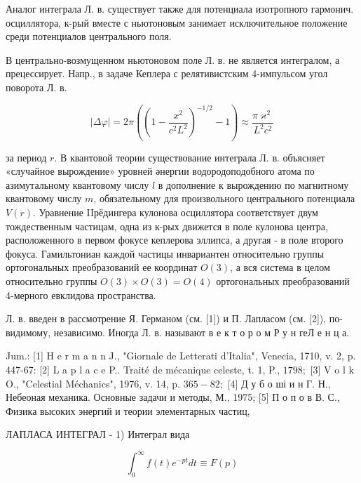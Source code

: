 \documentclass[10pt]{article}
\begin{document}
Аналог интеграла Л. в. существует также для потенциала изотропного гармонич. осциллятора, к-рый вместе с ньютоновым занимает исключительное положение среди потенциалов центрального поля.



В центрально-возмущенном ньютоновом поле Л. в. не является интегралом, а прецессирует. Напр., в задаче Кеплера с релятивистским 4-импульсом угол поворота Л. в.



\[

|\Delta \varphi|=2 \pi\left(\left(1-\frac{x^{2}}{c^{2} L^{2}}\right)^{-1 / 2}-1\right) \approx \frac{\pi \varkappa^{2}}{L^{2} c^{2}}

\]



за период $r$. В квантовой теории существование интеграла Л. в. объясняет «случайное вырождение» уровней әнергии водородоподобного атома по азимутальному квантовому числу $l$ в дополнение к вырождению по магнитному квантовому числу $m$, обязательному для произвольного центрального потенциала $V(r)$. Уравнение IIрёдингера кулонова осциллятора соответствует двум тождественным частицам, одна из к-рых движется в поле кулонова центра, расположенного в первом фокусе кеплерова эллипса, а другая - в поле второго фокуса. Гамильтониан каждой частицы инвариантен относительно группы ортогональных преобразований ее координат $O(3)$, а вся система в целом относительно группы $O(3) \times O(3)=O(4)$ ортогональных преобразований 4-мерного евклидова пространства.



Л. в. введен в рассмотрение Я. Германом (см. [1]) и П. Лапласом (см. [2]), по-видимому, независимо. Иногда Л. в. называют в е к т о р о м Р у н геЛ е н ц а.



Jum.: [1] H e r m a n n J., "Giornale de Letterati d'Italia", Venecia, 1710, v. 2, p. 447-67: [2] L a p l a c e P.. Traité de mécanique celeste, t. 1, P., $1798 ;$ [3] V o l k O., "Celestial Méchanics", 1976, v. 14, p. $365-82 ;$ [4] Д у б о ші и н Г. Н., Небеоная механика. Основные задачи и методы, М., 1975; [5] П о п о в В. С., Физика высоких энергий и теории элементарных частиц,



ЛАПЛАСА ИНТЕГРАЛ - 1) Интеграл вида



\[

\int_{0}^{\infty} f(t) e^{-p t} d t \equiv F(p)

\]
\end{document}
